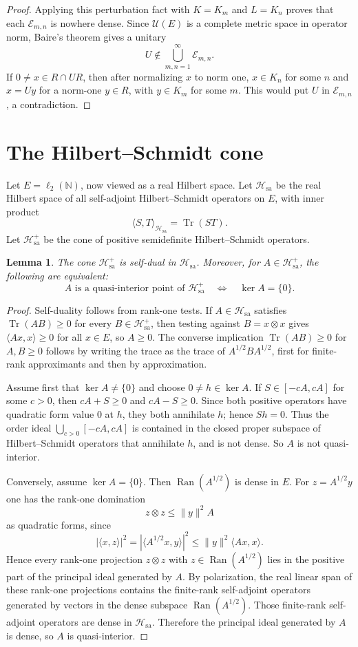 \documentclass[11pt]{article}
\newtheorem{lemma}{Lemma}
\DeclareMathOperator{\Ran}{Ran}
\DeclareMathOperator{\Tr}{Tr}
\newcommand{\Hsa}{\mathcal H_{\mathrm{sa}}}
\newcommand{\N}{\mathbb N}
\begin{document}
\begin{proof}
Applying this perturbation fact with $K=K_m$ and $L=K_n$ proves that each $\mathcal E_{m,n}$ is nowhere dense.  Since $\mathcal U(E)$ is a complete metric space in operator norm, Baire's theorem gives a unitary
\[
        U\notin \bigcup_{m,n=1}^\infty \mathcal E_{m,n}.
\]
If $0\neq x\in R\cap UR$, then after normalizing $x$ to norm one, $x\in K_n$ for some $n$ and $x=Uy$ for a norm-one $y\in R$, with $y\in K_m$ for some $m$.  This would put $U$ in $\mathcal E_{m,n}$, a contradiction.
\end{proof}

\section*{The Hilbert--Schmidt cone}

Let $E=\ell_2(\N)$, now viewed as a real Hilbert space.  Let $\Hsa$ be the real Hilbert space of all self-adjoint Hilbert--Schmidt operators on $E$, with inner product
\[
        \langle S,T\rangle_{\Hsa}=\Tr(ST).
\]
Let $\Hsa^+$ be the cone of positive semidefinite Hilbert--Schmidt operators.

\begin{lemma}\label{lem:hs-cone}
The cone $\Hsa^+$ is self-dual in $\Hsa$.  Moreover, for $A\in\Hsa^+$, the following are equivalent:
\[
        A\text{ is a quasi-interior point of }\Hsa^+
        \quad\Longleftrightarrow\quad
        \ker A=\{0\}.
\]
\end{lemma}

\begin{proof}
Self-duality follows from rank-one tests.  If $A\in\Hsa$ satisfies $\Tr(AB)\geq0$ for every $B\in\Hsa^+$, then testing against $B=x\otimes x$ gives $\langle Ax,x\rangle\geq0$ for all $x\in E$, so $A\geq0$.  The converse implication $\Tr(AB)\geq0$ for $A,B\geq0$ follows by writing the trace as the trace of $A^{1/2}BA^{1/2}$, first for finite-rank approximants and then by approximation.

Assume first that $\ker A\neq\{0\}$ and choose $0\neq h\in\ker A$.  If $S\in[-cA,cA]$ for some $c>0$, then $cA+S\geq0$ and $cA-S\geq0$.  Since both positive operators have quadratic form value $0$ at $h$, they both annihilate $h$; hence $Sh=0$.  Thus the order ideal $\bigcup_{c>0}[-cA,cA]$ is contained in the closed proper subspace of Hilbert--Schmidt operators that annihilate $h$, and is not dense.  So $A$ is not quasi-interior.

Conversely, assume $\ker A=\{0\}$.  Then $\Ran(A^{1/2})$ is dense in $E$.  For $z=A^{1/2}y$ one has the rank-one domination
\[
        z\otimes z \leq \|y\|^2 A
\]
as quadratic forms, since
\[
        |\langle x,z\rangle|^2
        =
        |\langle A^{1/2}x,y\rangle|^2
        \leq
        \|y\|^2\langle Ax,x\rangle.
\]
Hence every rank-one projection $z\otimes z$ with $z\in\Ran(A^{1/2})$ lies in the positive part of the principal ideal generated by $A$.  By polarization, the real linear span of these rank-one projections contains the finite-rank self-adjoint operators generated by vectors in the dense subspace $\Ran(A^{1/2})$.  Those finite-rank self-adjoint operators are dense in $\Hsa$.  Therefore the principal ideal generated by $A$ is dense, so $A$ is quasi-interior.
\end{proof}
\end{document}
